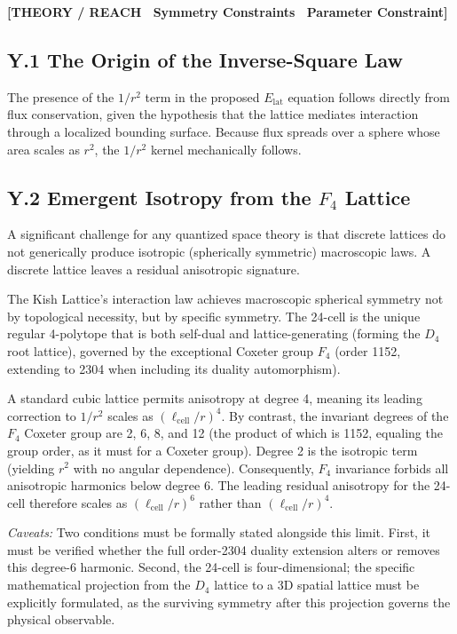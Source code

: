 \documentclass[11pt, letterpaper, openany]{book}
\begin{document}
\begin{center}
{\color{theorytag}\textbf{[THEORY / REACH \textbullet\ Symmetry Constraints \textbullet\ Parameter Constraint]}}
\end{center}

\subsection*{Y.1 The Origin of the Inverse-Square Law}

The presence of the $1/r^2$ term in the proposed $E_{\mathrm{lat}}$ equation follows directly from flux conservation, given the hypothesis that the lattice mediates interaction through a localized bounding surface. Because flux spreads over a sphere whose area scales as $r^2$, the $1/r^2$ kernel mechanically follows.

\subsection*{Y.2 Emergent Isotropy from the $F_4$ Lattice}

A significant challenge for any quantized space theory is that discrete lattices do not generically produce isotropic (spherically symmetric) macroscopic laws. A discrete lattice leaves a residual anisotropic signature. 

The Kish Lattice's interaction law achieves macroscopic spherical symmetry not by topological necessity, but by specific symmetry. The 24-cell is the unique regular 4-polytope that is both self-dual and lattice-generating (forming the $D_4$ root lattice), governed by the exceptional Coxeter group $F_4$ (order 1152, extending to 2304 when including its duality automorphism). 

A standard cubic lattice permits anisotropy at degree 4, meaning its leading correction to $1/r^2$ scales as $(\ell_{\text{cell}}/r)^4$. By contrast, the invariant degrees of the $F_4$ Coxeter group are 2, 6, 8, and 12 (the product of which is 1152, equaling the group order, as it must for a Coxeter group). Degree 2 is the isotropic term (yielding $r^2$ with no angular dependence). Consequently, $F_4$ invariance forbids all anisotropic harmonics below degree 6. The leading residual anisotropy for the 24-cell therefore scales as $(\ell_{\text{cell}}/r)^6$ rather than $(\ell_{\text{cell}}/r)^4$. 

\textit{Caveats:} Two conditions must be formally stated alongside this limit. First, it must be verified whether the full order-2304 duality extension alters or removes this degree-6 harmonic. Second, the 24-cell is four-dimensional; the specific mathematical projection from the $D_4$ lattice to a 3D spatial lattice must be explicitly formulated, as the surviving symmetry after this projection governs the physical observable.
\end{document}
